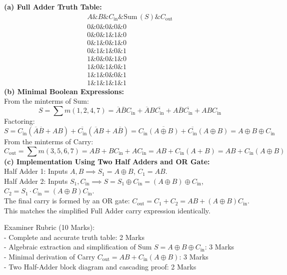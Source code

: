\begin{solbox}
\textbf{(a) Full Adder Truth Table:}\\
\[ \begin{array}{ccc|cc} A \& B \& C_{\mathrm{in}} \& \mathrm{Sum}\,(S) \& C_{\mathrm{out}} \\ \hline 0 \& 0 \& 0 \& 0 \& 0 \\ 0 \& 0 \& 1 \& 1 \& 0 \\ 0 \& 1 \& 0 \& 1 \& 0 \\ 0 \& 1 \& 1 \& 0 \& 1 \\ 1 \& 0 \& 0 \& 1 \& 0 \\ 1 \& 0 \& 1 \& 0 \& 1 \\ 1 \& 1 \& 0 \& 0 \& 1 \\ 1 \& 1 \& 1 \& 1 \& 1 \end{array} \]
\textbf{(b) Minimal Boolean Expressions:}\\
From the minterms of Sum:\\
\[ S = \sum m(1, 2, 4, 7) = \overline{A}\overline{B}C_{\mathrm{in}} + \overline{A}B\overline{C_{\mathrm{in}}} + A\overline{B}\overline{C_{\mathrm{in}}} + ABC_{\mathrm{in}} \]
Factoring:\\
\[ S = C_{\mathrm{in}}(\overline{A}\overline{B} + AB) + \overline{C_{\mathrm{in}}}(\overline{A}B + A\overline{B}) = C_{\mathrm{in}}\overline{(A \oplus B)} + \overline{C_{\mathrm{in}}}(A \oplus B) = A \oplus B \oplus C_{\mathrm{in}} \]
From the minterms of Carry:\\
\[ C_{\mathrm{out}} = \sum m(3, 5, 6, 7) = AB + BC_{\mathrm{in}} + AC_{\mathrm{in}} = AB + C_{\mathrm{in}}(A + B) = AB + C_{\mathrm{in}}(A \oplus B) \]
\textbf{(c) Implementation Using Two Half Adders and OR Gate:}\\
Half Adder 1: Inputs $A, B \implies S_1 = A \oplus B$, $C_1 = AB$.\\
Half Adder 2: Inputs $S_1, C_{\mathrm{in}} \implies S = S_1 \oplus C_{\mathrm{in}} = (A \oplus B) \oplus C_{\mathrm{in}}$, $C_2 = S_1 \cdot C_{\mathrm{in}} = (A \oplus B)C_{\mathrm{in}}$.\\
The final carry is formed by an OR gate: $C_{\mathrm{out}} = C_1 + C_2 = AB + (A \oplus B)C_{\mathrm{in}}$.\\
This matches the simplified Full Adder carry expression identically.
\end{solbox}

\begin{examinertip}
Examiner Rubric (10 Marks):\\
- Complete and accurate truth table: 2 Marks\\
- Algebraic extraction and simplification of Sum $S = A \oplus B \oplus C_{\mathrm{in}}$: 3 Marks\\
- Minimal derivation of Carry $C_{\mathrm{out}} = AB + C_{\mathrm{in}}(A \oplus B)$: 3 Marks\\
- Two Half-Adder block diagram and cascading proof: 2 Marks
\end{examinertip}


